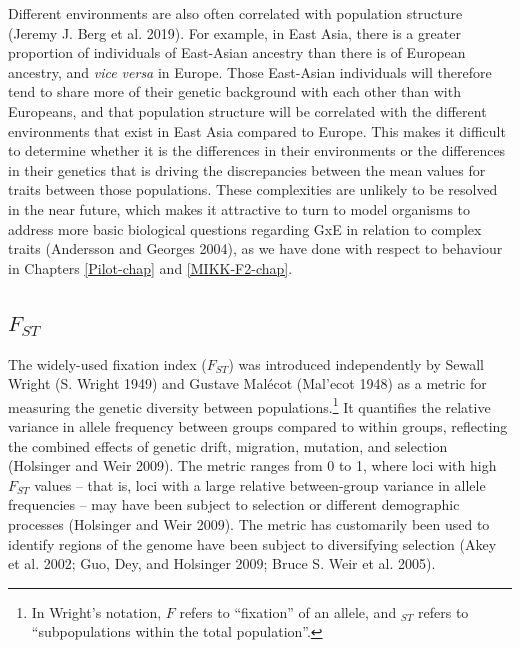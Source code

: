 \documentclass[
]{book}
\begin{document}
Different environments are also often correlated with population structure (Jeremy J. Berg et al. 2019). For example, in East Asia, there is a greater proportion of individuals of East-Asian ancestry than there is of European ancestry, and \emph{vice versa} in Europe. Those East-Asian individuals will therefore tend to share more of their genetic background with each other than with Europeans, and that population structure will be correlated with the different environments that exist in East Asia compared to Europe. This makes it difficult to determine whether it is the differences in their environments or the differences in their genetics that is driving the discrepancies between the mean values for traits between those populations. These complexities are unlikely to be resolved in the near future, which makes it attractive to turn to model organisms to address more basic biological questions regarding GxE in relation to complex traits (Andersson and Georges 2004), as we have done with respect to behaviour in Chapters \ref{Pilot-chap} and \ref{MIKK-F2-chap}.

\hypertarget{Fst-descr}{%
\subsection{\texorpdfstring{\(F_{ST}\)}{F\_\{ST\}}}\label{Fst-descr}}

The widely-used fixation index (\(F_{ST}\)) was introduced independently by Sewall Wright (S. Wright 1949) and Gustave Malécot (Mal'ecot 1948) as a metric for measuring the genetic diversity between populations.\footnote{In Wright's notation, \(F\) refers to ``fixation'' of an allele, and \(_{ST}\) refers to ``subpopulations within the total population''.} It quantifies the relative variance in allele frequency between groups compared to within groups, reflecting the combined effects of genetic drift, migration, mutation, and selection (Holsinger and Weir 2009). The metric ranges from 0 to 1, where loci with high \(F_{ST}\) values -- that is, loci with a large relative between-group variance in allele frequencies -- may have been subject to selection or different demographic processes (Holsinger and Weir 2009). The metric has customarily been used to identify regions of the genome have been subject to diversifying selection (Akey et al. 2002; Guo, Dey, and Holsinger 2009; Bruce S. Weir et al. 2005).
\end{document}
